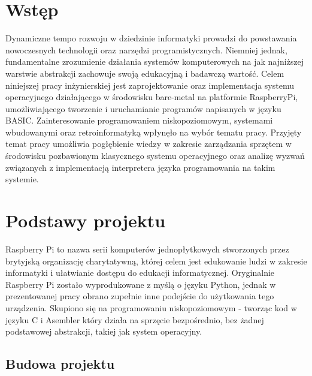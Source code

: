\documentclass[shortabstract]{iithesis}
\author         {Aleksandra Kosińska \and Cezary Stajszczyk}
\date           {31 sierpnia 2023}                     %
\begin{document}

\chapter{Wstęp}
Dynamiczne tempo rozwoju w dziedzinie informatyki prowadzi do powstawania nowoczesnych technologii oraz narzędzi programistycznych. Niemniej jednak, fundamentalne zrozumienie działania systemów komputerowych na jak najniższej warstwie abstrakcji zachowuje swoją edukacyjną i badawczą wartość.
Celem niniejszej pracy inżynierskiej jest zaprojektowanie oraz implementacja systemu operacyjnego działającego w środowisku bare-metal na platformie RaspberryPi, umożliwiającego tworzenie i uruchamianie programów napisanych w języku BASIC. Zainteresowanie programowaniem niskopoziomowym, systemami wbudowanymi oraz retroinformatyką wpłynęło na wybór tematu pracy.
Przyjęty temat pracy umożliwia pogłębienie wiedzy w zakresie zarządzania sprzętem w środowisku pozbawionym klasycznego systemu operacyjnego oraz analizę wyzwań związanych z implementacją interpretera języka programowania na takim systemie.


\chapter{Podstawy projektu}
Raspberry Pi to nazwa serii komputerów jednopłytkowych stworzonych przez brytyjską organizację charytatywną, której celem jest edukowanie ludzi w zakresie informatyki i ułatwianie dostępu do edukacji informatycznej. Oryginalnie Raspberry Pi zostało wyprodukowane z myślą o języku Python, jednak w prezentowanej pracy obrano zupełnie inne podejście do użytkowania tego urządzenia. Skupiono się na programowaniu niskopoziomowym - tworząc kod w języku C i Asembler który działa na sprzęcie bezpośrednio, bez żadnej podstawowej abstrakcji, takiej jak system operacyjny.

\section{Budowa projektu}
\end{document}
